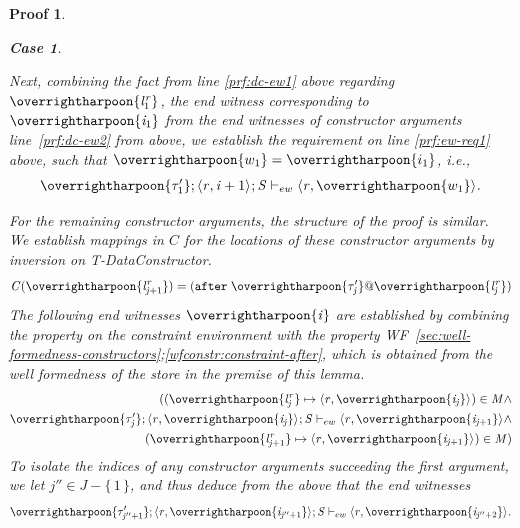 \documentclass[showabstract,showacknowledgments,showpreface,showdedication,school]{iuphd}
\newtheorem*{bcase}{Case}
\theoremstyle{nonumberplain}
\newtheorem{nproof}{Proof}
\newcommand{\keywd}[1]{\mathit{#1}}
\newcommand{\gramwd}[1]{\texttt{#1}}
\newcommand{\skeywd}[1]{\mathit{#1}}
\newcommand{\TYP}{\keywd{\tau}}
\newcommand{\loc}{\skeywd{l}}
\newcommand{\concreteloc}[3]{\ensuremath{\langle #1, #2 \rangle ^{#3}}}
\newcommand{\reg}{\skeywd{r}}
\newcommand{\ind}{\keywd{i}}
\newcommand{\indj}{\keywd{j}}
\newcommand{\STOR}{\keywd{S}}
\newcommand{\afterl}[1]{(\gramwd{after}\; #1)}
\newcommand\set[1]{\{ \, \ensuremath{#1} \,\}}
\newcommand{\CENV}{\keywd{C}}
\newcommand{\MENV}{\keywd{M}}
\newcommand{\locreg}[2]{\ensuremath{{#1}^{#2}}}
\newcommand{\ewitness}[4]{\ensuremath{#1;#2;#3 \vdash_{ew} #4}}
\newcommand{\refwellformed}[2]{WF~\ref{#1};\ref{#2}}
\newcommand{\tdatacon}{T-DataConstructor}
\newcommand{\overharpoon}[1]{\overrightharpoon{#1}}
\begin{document}
\begin{nproof}
\begin{bcase}
\begin{itemize}
\begin{itemize}
\begin{itemize}
           Next, combining the fact from line \ref{prf:dc-ew1} above regarding $\overharpoon{\locreg{\loc}{\reg}_1}$, the
           end witness corresponding to $\overharpoon{\ind_1}$ from the end witnesses of
           constructor arguments line~\ref{prf:dc-ew2} from above, we
           establish the requirement on line \ref{prf:ew-req1} above, such that $\overharpoon{w_1} = \overharpoon{i_1}$, i.e.,
           \begin{align}
           \ewitness{\overharpoon{\TYP'_1}}{\concreteloc{\reg}{\ind + 1}{}}{\STOR}{\concreteloc{\reg}{\overharpoon{w_1}}{}} \label{prf:dc-ew-f1}.
           \end{align}

           For the remaining constructor arguments, the structure of the proof is similar.
           We establish mappings in $\CENV$ for the locations of these constructor arguments
           by inversion on \tdatacon{}.
           \begin{align*}
           \CENV(\overharpoon{\locreg{\loc}{\reg}_{\indj+1}}) = \afterl{\overharpoon{\TYP'_{\indj}} \ensuremath{@} \overharpoon{\locreg{\loc}{\reg}_{\indj}}}
           \end{align*}
           The following end witnesses $\overharpoon{\ind}$ are established by combining the property
           on the constraint environment
           with the property
           \refwellformed{sec:well-formedness-constructors}{wfconstr:constraint-after},
           which is obtained from the well formedness of the store in the premise of this lemma.
           \begin{align*}
           ((\overharpoon{\locreg{\loc}{\reg}_{\indj}} \mapsto \concreteloc{\reg}{\overharpoon{\ind_{\indj}}}{}) \in \MENV \wedge \\
                       \ewitness{\overharpoon{\TYP'_{\indj}}}{\concreteloc{\reg}{\overharpoon{\ind_{\indj}}}{}}{\STOR}{\concreteloc{\reg}{\overharpoon{\ind_{\indj+1}}}{}} \wedge \\
                       (\overharpoon{\locreg{\loc}{\reg}_{\indj+1}} \mapsto \concreteloc{\reg}{\overharpoon{\ind_{\indj+1}}}{}) \in \MENV)
           \end{align*}
           To isolate the indices of any constructor arguments succeeding the
           first argument, we let $\indj'' \in J - \set{1}$, and thus deduce
           from the above that the end witnesses
           \begin{align*}
           \ewitness{\overharpoon{\TYP_{\indj''+1}'}}{\concreteloc{\reg}{\overharpoon{\ind_{\indj''+1}}}{}}{\STOR}{\concreteloc{\reg}{\overharpoon{\ind_{\indj'' + 2}}}{}}.

\end{align*}
\end{itemize}
\end{itemize}
\end{itemize}
\end{bcase}
\end{nproof}
\end{document}
